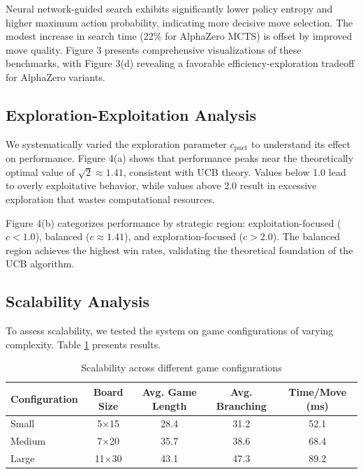 \documentclass{article}
\begin{document}
Neural network-guided search exhibits significantly lower policy entropy and higher maximum action probability, indicating more decisive move selection. The modest increase in search time (22\% for AlphaZero MCTS) is offset by improved move quality. Figure 3 presents comprehensive visualizations of these benchmarks, with Figure 3(d) revealing a favorable efficiency-exploration tradeoff for AlphaZero variants.

\subsection{Exploration-Exploitation Analysis}

We systematically varied the exploration parameter $c_{\text{puct}}$ to understand its effect on performance. Figure 4(a) shows that performance peaks near the theoretically optimal value of $\sqrt{2} \approx 1.41$, consistent with UCB theory. Values below 1.0 lead to overly exploitative behavior, while values above 2.0 result in excessive exploration that wastes computational resources.

Figure 4(b) categorizes performance by strategic region: exploitation-focused ($c < 1.0$), balanced ($c \approx 1.41$), and exploration-focused ($c > 2.0$). The balanced region achieves the highest win rates, validating the theoretical foundation of the UCB algorithm.

\subsection{Scalability Analysis}

To assess scalability, we tested the system on game configurations of varying complexity. Table \ref{tab:scalability} presents results.

\begin{table}[h]
\centering
\caption{Scalability across different game configurations}
\label{tab:scalability}
\begin{tabular}{lcccc}
\toprule
Configuration & Board Size & Avg. Game Length & Avg. Branching & Time/Move (ms) \\
\midrule
Small & 5×15 & 28.4 & 31.2 & 52.1 \\
Medium & 7×20 & 35.7 & 38.6 & 68.4 \\
Large & 11×30 & 43.1 & 47.3 & 89.2 \\
\bottomrule
\end{tabular}
\end{table}
\end{document}
